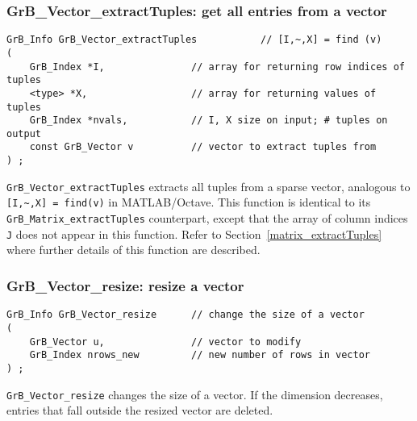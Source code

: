 \documentclass[12pt]{article}
\begin{document}
\subsubsection{{\sf GrB\_Vector\_extractTuples:} get all entries from a vector}
\label{vector_extractTuples}

\begin{mdframed}[userdefinedwidth=6in]
{\footnotesize
\begin{verbatim}
GrB_Info GrB_Vector_extractTuples           // [I,~,X] = find (v)
(
    GrB_Index *I,               // array for returning row indices of tuples
    <type> *X,                  // array for returning values of tuples
    GrB_Index *nvals,           // I, X size on input; # tuples on output
    const GrB_Vector v          // vector to extract tuples from
) ;
\end{verbatim} } \end{mdframed}

\verb'GrB_Vector_extractTuples' extracts all tuples from a sparse vector,
analogous to \verb'[I,~,X] = find(v)' in MATLAB/Octave.  This function is
identical to its \verb'GrB_Matrix_extractTuples' counterpart, except that the
array of column indices \verb'J' does not appear in this function.  Refer to
Section~\ref{matrix_extractTuples} where further details of this function are
described.

\subsubsection{{\sf GrB\_Vector\_resize:}          resize a vector}
\label{vector_resize}

\begin{mdframed}[userdefinedwidth=6in]
{\footnotesize
\begin{verbatim}
GrB_Info GrB_Vector_resize      // change the size of a vector
(
    GrB_Vector u,               // vector to modify
    GrB_Index nrows_new         // new number of rows in vector
) ;
\end{verbatim} } \end{mdframed}

\verb'GrB_Vector_resize' changes the size of a vector.  If the dimension
decreases, entries that fall outside the resized vector are deleted.
\end{document}
